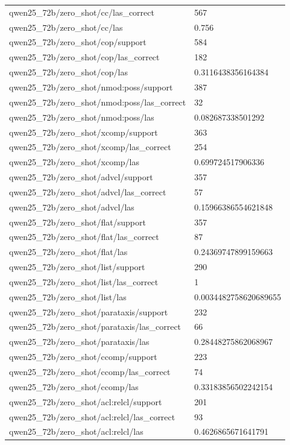 \begin{tabular}{ll}
qwen25\_72b/zero\_shot/cc/las\_correct & 567 \\
qwen25\_72b/zero\_shot/cc/las & 0.756 \\
qwen25\_72b/zero\_shot/cop/support & 584 \\
qwen25\_72b/zero\_shot/cop/las\_correct & 182 \\
qwen25\_72b/zero\_shot/cop/las & 0.3116438356164384 \\
qwen25\_72b/zero\_shot/nmod:poss/support & 387 \\
qwen25\_72b/zero\_shot/nmod:poss/las\_correct & 32 \\
qwen25\_72b/zero\_shot/nmod:poss/las & 0.082687338501292 \\
qwen25\_72b/zero\_shot/xcomp/support & 363 \\
qwen25\_72b/zero\_shot/xcomp/las\_correct & 254 \\
qwen25\_72b/zero\_shot/xcomp/las & 0.699724517906336 \\
qwen25\_72b/zero\_shot/advcl/support & 357 \\
qwen25\_72b/zero\_shot/advcl/las\_correct & 57 \\
qwen25\_72b/zero\_shot/advcl/las & 0.15966386554621848 \\
qwen25\_72b/zero\_shot/flat/support & 357 \\
qwen25\_72b/zero\_shot/flat/las\_correct & 87 \\
qwen25\_72b/zero\_shot/flat/las & 0.24369747899159663 \\
qwen25\_72b/zero\_shot/list/support & 290 \\
qwen25\_72b/zero\_shot/list/las\_correct & 1 \\
qwen25\_72b/zero\_shot/list/las & 0.0034482758620689655 \\
qwen25\_72b/zero\_shot/parataxis/support & 232 \\
qwen25\_72b/zero\_shot/parataxis/las\_correct & 66 \\
qwen25\_72b/zero\_shot/parataxis/las & 0.28448275862068967 \\
qwen25\_72b/zero\_shot/ccomp/support & 223 \\
qwen25\_72b/zero\_shot/ccomp/las\_correct & 74 \\
qwen25\_72b/zero\_shot/ccomp/las & 0.33183856502242154 \\
qwen25\_72b/zero\_shot/acl:relcl/support & 201 \\
qwen25\_72b/zero\_shot/acl:relcl/las\_correct & 93 \\
qwen25\_72b/zero\_shot/acl:relcl/las & 0.4626865671641791 \\

\end{tabular}
